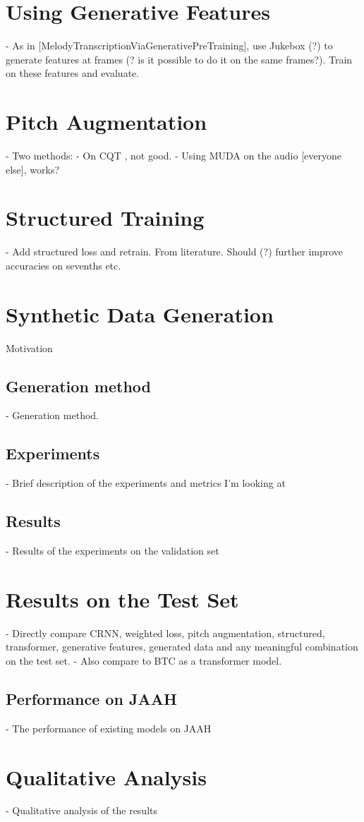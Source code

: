 \section{Using Generative Features}

- As in [MelodyTranscriptionViaGenerativePreTraining], use Jukebox (?) to generate features at frames (? is it possible to do it on the same frames?). Train on these features and evaluate.

\section{Pitch Augmentation}
- Two methods:
- On CQT \citet{ACRLargeVocab1}, not good.
- Using MUDA on the audio [everyone else], works?

\section{Structured Training}

- Add structured loss and retrain. From literature. Should (?) further improve accuracies on sevenths etc.


\section{Synthetic Data Generation}\label{chap:synthetic_data}

Motivation

\subsection{Generation method} 
- Generation method. 
\subsection{Experiments}
- Brief description of the experiments and metrics I'm looking at
\subsection{Results}
- Results of the experiments on the validation set

\section{Results on the Test Set}

- Directly compare CRNN, weighted loss, pitch augmentation, structured, transformer, generative features, generated data and any meaningful combination on the test set.
- Also compare to BTC as a transformer model.

\subsection{Performance on JAAH}
- The performance of existing models on JAAH


\section{Qualitative Analysis}
- Qualitative analysis of the results